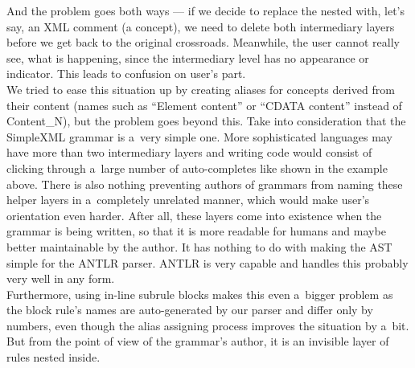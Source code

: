 And the problem goes both ways --- if we decide to replace the nested  with, let's say, an XML comment (a  concept), we need to delete both intermediary layers before we get back to the original  crossroads.
Meanwhile, the user cannot really see, what is happening, since the intermediary level has no appearance or indicator.
This leads to confusion on user's part.
\\

We tried to ease this situation up by creating aliases for concepts derived from their content (names such as “Element content” or “CDATA content” instead of Content{\_}N), but the problem goes beyond this.
Take into consideration that the SimpleXML grammar is a~very simple one.
More sophisticated languages may have more than two intermediary layers and writing code would consist of clicking through a~large number of auto-completes like shown in the example above.
There is also nothing preventing authors of grammars from naming these helper layers in a~completely unrelated manner, which would make user's orientation even harder.
After all, these layers come into existence when the grammar is being written, so that it is more readable for humans and maybe better maintainable by the author.
It has nothing to do with making the AST simple for the ANTLR parser.
ANTLR is very capable and handles this probably very well in any form.
\\

Furthermore, using in-line subrule blocks makes this even a~bigger problem as the block rule's names are auto-generated by our parser and differ only by numbers, even though the alias assigning process improves the situation by a~bit.
But from the point of view of the grammar's author, it is an invisible layer of rules nested inside.

